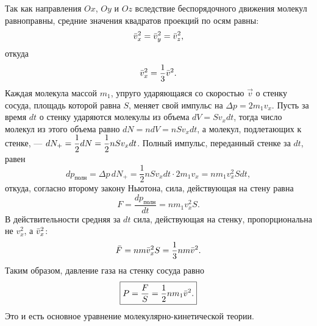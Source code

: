 	Так как направления $Ox$, $Oy$ и $Oz$ вследствие беспорядочного движения молекул равноправны, средние значения квадратов проекций по осям равны:
		$$\bar v_x^2=\bar v_y^2=\bar v_z^2,$$
	откуда
		$$\bar v_x^2=\frac{1}{3}\bar v^2.$$
	Каждая молекула массой $m_1$, упруго ударяющаяся со скоростью $\vec{v}$ о стенку сосуда, площадь которой равна $S$, меняет свой импульс на $\Delta p = 2m_1v_x$. Пусть за время $dt$ о стенку ударяются молекулы из объема $dV=Sv_xdt$, тогда число молекул из этого объема равно $dN=ndV=nSv_xdt$, а молекул, подлетающих к стенке, --- $dN_+ \hm=\dfrac{1}{2}dN=\dfrac{1}{2}nSv_xdt$. Полный импульс, переданный стенке за $dt$,  равен 
		$$dp_{\text{полн}}=\Delta p\,dN_+=\frac{1}{2}nSv_xdt \cdot 2m_1v_x=nm_1v_x^2Sdt,$$
	откуда, согласно второму закону Ньютона, сила, действующая на стену равна
		$$F=\frac{dp_{\text{полн}}}{dt}=nm_1v_x^2S.$$
	В действительности средняя за $dt$ сила, действующая на стенку, пропорциональна не $v_x^2$, а $\bar v_x^2$:
		$$\bar F=nm\bar v_x^2S=\frac{1}{3}nm\bar v^2.$$
	Таким образом, давление газа на стенку сосуда равно
		$$\boxed{P=\frac{F}{S}=\frac{1}{2}nm_1\bar v^2.}$$
	Это и есть основное уравнение молекулярно-кинетической теории.
